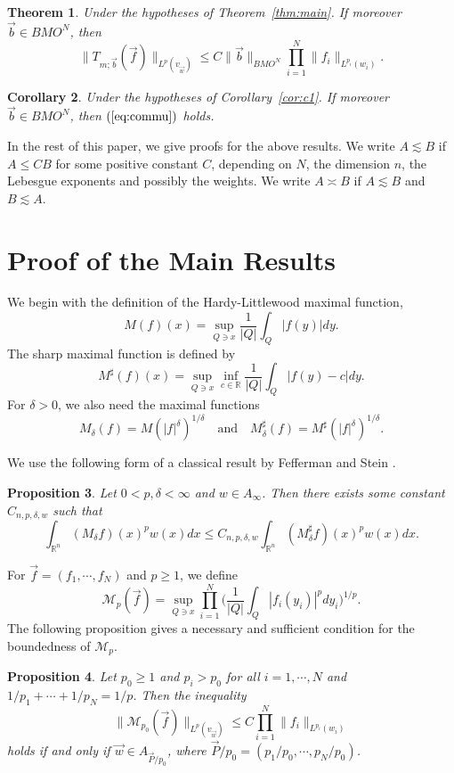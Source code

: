 \documentclass[11pt,oneside,onecolumn]{amsart}
\numberwithin{equation}{section}
\newtheorem{Theorem}{Theorem}[section]
\newtheorem{Proposition}[Theorem]{Proposition}
\newtheorem{Corollary}[Theorem]{Corollary}
\begin{document}
\begin{Theorem}\label{thm:main1}
Under the hypotheses of Theorem~\ref{thm:main}. If moreover $\vec{b}\in BMO^N$, then
\begin{equation}\label{eq:commu}
\|T_{m;\vec{b}}(\vec{f})\|_{L^p(v^{}_{\vec{w}})}\le C \|\vec{b}\|_{BMO^N}\prod_{i=1}^N \|f_i\|_{L^{p_i}(w_i)}.
\end{equation}
\end{Theorem}

\begin{Corollary}\label{cor:c2}
Under the hypotheses of Corollary~\ref{cor:c1}. If moreover  $\vec{b}\in BMO^N$, then $(\ref{eq:commu})$ holds.
\end{Corollary}

In the rest of this paper, we give proofs for the above results.
We write $A\lesssim B$ if $A\le CB$ for some positive constant $C$, depending on $N$, the dimension $n$, the Lebesgue exponents and possibly the weights. We
write $A\asymp B$ if $A\lesssim B$ and $B\lesssim A$.

\section{Proof of the Main Results}
We begin with the definition of the Hardy-Littlewood maximal function,
\[
  M(f)(x)=\sup_{Q\ni x}\frac{1}{|Q|}\int_Q |f(y)|dy.
\]
The sharp maximal function is defined by
\[
  M^\sharp(f)(x)=\sup_{Q\ni x}\inf_{c\in{\mathbb{R}}}\frac{1}{|Q|}\int_Q |f(y)-c|dy.
\]
For $\delta>0$, we also need the maximal functions 
\[
  M_\delta(f)=M(|f|^\delta)^{1/\delta}\quad\mbox{and}\quad M_\delta^\sharp (f)=M^\sharp(|f|^\delta)^{1/\delta}.
\]

We use the following form of a classical result by Fefferman and Stein \cite{FS}.
\begin{Proposition}\label{prop:p1}
Let $0<p,\delta<\infty$ and $w\in A_{\infty}$. Then there exists some constant $C_{n,p,\delta,w}$ such that
\[
  \int_{{\mathbb{R}}^n}(M_\delta f)(x)^pw(x)dx\le C_{n,p,\delta,w}\int_{{\mathbb{R}}^n}(M_\delta^\sharp f)(x)^pw(x)dx.
\]
\end{Proposition}

For $\vec{f}=(f_1,\cdots,f_N)$ and $p\ge 1$, we define
\[
  \mathcal{M}_p(\vec{f})=\sup_{Q\ni x} \prod_{i=1}^N\bigg(\frac{1}{|Q|}\int_Q |f_i(y_i)|^p dy_i\bigg)^{1/p}.
\]
The following proposition gives a necessary and sufficient condition for the boundedness
of $\mathcal{M}_p$.
\begin{Proposition}\cite[Proposition 2.3]{BD}\label{prop:bd}
Let $p_0\ge 1$ and $p_i>p_0$ for all $i=1,\cdots, N$ and $1/{p_1}+\cdots+1/{p_N}=1/p$. Then the inequality
\[
   \|\mathcal{M}_{p_0}(\vec{f})\|_{L^p(v^{}_{\vec{w}})}\le C \prod_{i=1}^N \|f_i\|_{L^{p_i}(w_i)}
\]
holds if and only if $\vec{w}\in A_{\vec{P}/{p_0}}$, where $\vec{P}/{p_0}=(p_1/{p_0},\cdots, p_N/{p_0})$.
\end{Proposition}
\end{document}
